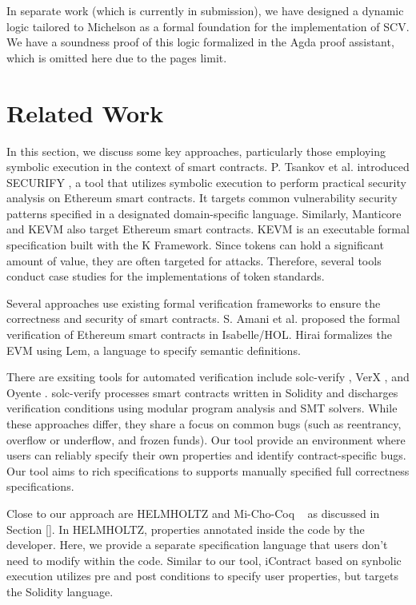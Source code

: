 \documentclass[runningheads]{llncs}
\begin{document}
In separate work (which is currently in submission), we have designed a dynamic logic tailored to Michelson as a formal foundation for the implementation of SCV. We have a soundness proof of this logic formalized in the Agda proof assistant, which is omitted here due to the pages limit.
\section{Related Work}
\label{sec:related-work}

In this section, we discuss some key approaches, particularly those employing symbolic execution in the context of smart contracts. P. Tsankov et al. introduced
SECURIFY \cite{securify}, a tool that utilizes symbolic execution to
perform practical security analysis on Ethereum smart contracts. It
targets common vulnerability security patterns specified in a
designated domain-specific language. 
Similarly, Manticore
\cite{manticore} and KEVM \cite{kevm} also target Ethereum smart contracts. KEVM is an executable formal
specification built with the K Framework.
Since tokens can hold a significant amount of value, they are often targeted for
attacks. Therefore, several tools \cite{kevm,park} conduct case
studies for the implementations of token standards. 

Several approaches use existing formal verification frameworks to
ensure the correctness and security of smart contracts. S. Amani et
al. \cite{isabelle} proposed the formal verification of Ethereum smart
contracts in Isabelle/HOL. Hirai \cite{hirai} formalizes the EVM using
Lem, a language to specify semantic definitions. 

There are exsiting tools for automated verification include solc-verify \cite{solc}, VerX \cite{verx}, and Oyente \cite{oyente}. solc-verify processes smart contracts written in Solidity and discharges verification conditions using modular program analysis and SMT solvers.
While these approaches differ, they share a focus on common bugs (such as reentrancy, overflow or underflow, and frozen funds). Our tool provide an environment where users can reliably specify their own properties and identify contract-specific bugs. Our tool aims to rich specifications to supports manually specified full correctness specifications.


Close to our approach are HELMHOLTZ \cite{helmholtz} and Mi-Cho-Coq ~\cite{micho} as discussed in Section \ref{}. In HELMHOLTZ, properties annotated inside the code by the developer. Here, we provide a separate specification language that users don't need to modify within the code. 
Similar to our tool, iContract \cite{icontract} based on synbolic execution utilizes pre and post conditions to specify user properties, but targets the Solidity language. 
\end{document}
